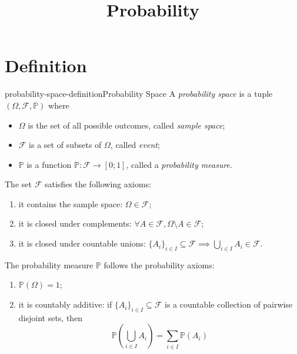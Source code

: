 \documentclass[preview]{standalone}
\begin{document}
\title{Probability}
\genpage

% 

\section{Definition}

\begin{snippetdefinition}{probability-space-definition}{Probability Space}
    A \textit{probability space} is a tuple \((\Omega, \mathcal{F}, \mathbb{P})\)
    where
    \begin{itemize}
        \item \(\Omega\) is the set of all possible outcomes, called \textit{sample space};
        \item \(\mathcal{F}\) is a set of subsets of \(\Omega\), called \textit{event};
        \item \(\mathbb{P}\) is a function \(\mathbb{P}\colon \mathcal{F} \to [0;1]\), called a \textit{probability measure}. 
    \end{itemize}
    The set \(\mathcal{F}\) satisfies the following axioms:
    \begin{enumerate}
        \item it contains the sample space: \(\Omega \in \mathcal{F}\);
        \item it is closed under complements: \(\forall A \in \mathcal{F}, \Omega \setminus A \in \mathcal{F}\);
        \item it is closed under countable unions: \({\{A_i\}}_{i \in I} \subseteq \mathcal{F} \implies \bigcup_{i \in I}A_i \in \mathcal{F}\).
    \end{enumerate}
    The probability measure \(\mathbb{P}\) follows the probability axioms:
    \begin{enumerate}
        \item \(\mathbb{P}(\Omega) = 1\);
        \item it is countably additive: if \({\{A_i\}}_{i \in I} \subseteq \mathcal{F}\)
        is a countable collection of pairwise disjoint sets, then
        \[
            \mathbb{P}\left(\bigcup_{i \in I}A_i\right) = \sum_{i \in I} \mathbb{P}(A_i)
        \]
    \end{enumerate}
\end{snippetdefinition}
\end{document}
